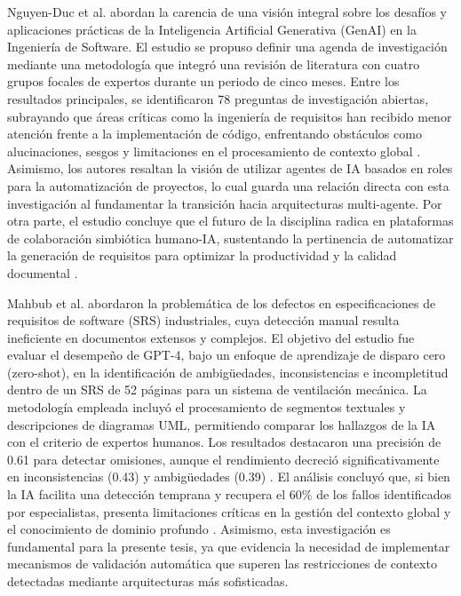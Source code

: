 Nguyen-Duc et al. \cite{Nguyen-Duc2025} abordan la carencia de una visión integral sobre los desafíos y aplicaciones prácticas de la Inteligencia 
Artificial Generativa (GenAI) en la Ingeniería de Software. El estudio se propuso definir una agenda de investigación mediante una metodología que 
integró una revisión de literatura con cuatro grupos focales de expertos durante un periodo de cinco meses. Entre los resultados principales, se 
identificaron 78 preguntas de investigación abiertas, subrayando que áreas críticas como la ingeniería de requisitos han recibido menor atención frente 
a la implementación de código, enfrentando obstáculos como alucinaciones, sesgos y limitaciones en el procesamiento de contexto 
global \cite{Nguyen-Duc2025}. Asimismo, los autores resaltan la visión de utilizar agentes de IA basados en roles para la automatización 
de proyectos, lo cual guarda una relación directa con esta investigación al fundamentar la transición hacia arquitecturas multi-agente. Por 
otra parte, el estudio concluye que el futuro de la disciplina radica en plataformas de colaboración simbiótica humano-IA, sustentando la pertinencia 
de automatizar la generación de requisitos para optimizar la productividad y la calidad documental \cite{Nguyen-Duc2025}.

Mahbub et al. \cite{Mahbub2024} abordaron la problemática de los defectos en especificaciones de requisitos de software (SRS) industriales, cuya 
detección manual resulta ineficiente en documentos extensos y complejos. El objetivo del estudio fue evaluar el desempeño de GPT-4, bajo un enfoque 
de aprendizaje de disparo cero (zero-shot), en la identificación de ambigüedades, inconsistencias e incompletitud dentro de un SRS de 52 páginas para 
un sistema de ventilación mecánica. La metodología empleada incluyó el procesamiento de segmentos textuales y descripciones de diagramas UML, permitiendo 
comparar los hallazgos de la IA con el criterio de expertos humanos. Los resultados destacaron una precisión de 0.61 para detectar omisiones, aunque el 
rendimiento decreció significativamente en inconsistencias (0.43) y ambigüedades (0.39) \cite{Mahbub2024}. El análisis concluyó que, si bien la IA 
facilita una detección temprana y recupera el 60\% de los fallos identificados por especialistas, presenta limitaciones críticas en la gestión del 
contexto global y el conocimiento de dominio profundo \cite{Mahbub2024}. Asimismo, esta investigación es fundamental para la presente tesis, ya que 
evidencia la necesidad de implementar mecanismos de validación automática que superen las restricciones de contexto detectadas mediante arquitecturas 
más sofisticadas.


